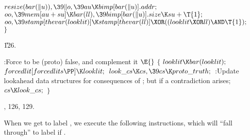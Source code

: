 ${}\\{resize}(\\{bar}(\|u)),\39\|o,\39\\{au}\K\\{bimp}[\\{bar}(\|u)].%
\\{addr};{}$\2\6
${}\\{oo},\39\\{mem}[\\{au}+\\{su}]\K\\{bar}(\\{ll}),\39\\{bimp}[\\{bar}(\|u)].%
\\{size}\K\\{su}+\T{1};{}$\6
${}\\{oo},\39\\{stamp}[\\{thevar}(\\{looklit})]\K\\{stamp}[\\{thevar}(\\{ll})]%
\XOR((\\{looklit}\XOR\\{ll})\AND\T{1});{}$\6
\4${}\}{}$\2\par
\U126.\fi

\B{}:Force  to be (proto) false, and complement it%
\X${}\E{}$\6
${}\{{}$\1\6
${}\\{looklit}\K\\{bar}(\\{looklit});{}$\6
${}\\{forcedlit}[\\{forcedlits}\PP]\K\\{looklit};{}$\6
${}\\{look\_cs}\K\\{cs},\39\\{cs}\K\\{proto\_truth};{}$\6
:Update lookahead data structures for consequences of ;
but  if a contradiction arises\X;\6
${}\\{cs}\K\\{look\_cs};{}$\6
\4${}\}{}$\2\par
{}, 126, 129.\fi

When we get to label , we execute the following
instructions, which will ``fall through'' to label  if
.

